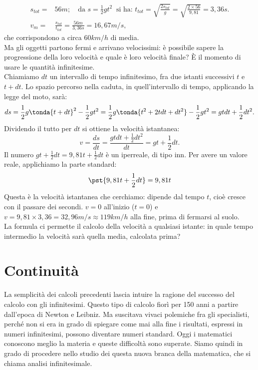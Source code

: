 \begin{align*}
 s_{tot}= & 56m;\quad \text{da }s=\frac{1}{2}gt^2\ \text{ si ha: }
 t_{tot}=\sqrt{\frac{2s_{tot}}{g}}=\sqrt{\frac{2\times 56}{9,81}}=3,36 s.\\
 v_m= & \frac{s_{tot}}{t_{tot}}=\frac{56 m}{3,36 s}=16,67 m/s,
\end{align*}
che corrispondono a circa $60 km/h$ di media.\\
Ma gli oggetti partono fermi e arrivano velocissimi: è possibile sapere la
progressione della loro velocità e quale è loro velocità finale? È il momento
di usare le quantità infinitesime.\\
Chiamiamo $dt$ un intervallo di tempo infinitesimo, fra due istanti successivi
$t$ e $t+dt$.
Lo spazio percorso nella caduta, in quell'intervallo di tempo, applicando la legge del 
moto, sarà:
\[
 ds=\frac{1}{2}g\tonda{t+dt}^2-\frac{1}{2}gt^2=
 \frac{1}{2}g\tonda{t^2+2tdt+dt^2}-\frac{1}{2}gt^2=
 gtdt+\frac{1}{2}dt^2. 
\]
Dividendo il tutto per $dt$ si ottiene la velocità istantanea:
\[
 v=\frac{ds}{dt}=\frac{gtdt+\frac{1}{2}dt^2}{dt}=gt+\frac{1}{2}dt.
\]
Il numero $gt+\frac{1}{2}dt=9,81t+\frac{1}{2}dt$ è un iperreale, di tipo
inn. Per avere un valore reale, applichiamo la parte standard:
\[
 \pst{9,81t+\frac{1}{2}dt}=9,81t
\]
Questa è la velocità istantanea che cerchiamo: dipende dal tempo $t$,
cioè cresce con il passare dei secondi. $v=0$ all'inizio ($t=0$) e
$v=9,81\times 3,36=32,96 m/s\approx 119 km/h$ alla fine, prima di fermarsi al suolo.\\
La formula ci permette il calcolo della velocità a qualsiasi istante:
in quale tempo intermedio la velocità sarà quella media, calcolata prima? 


\section{Continuità}
\label{04_diffcomtinuità}
La semplicità dei calcoli precedenti lascia intuire la ragione del successo del
calcolo con gli infinitesimi.  Questo tipo di calcolo fiorì per 150 anni a 
partire dall'epoca di Newton e Leibniz. Ma suscitava vivaci polemiche fra
gli specialisti, perché non si era in grado di spiegare come mai alla fine i 
risultati, espressi in numeri infinitesimi, possono diventare numeri standard. 
Oggi i matematici conoscono meglio la materia e queste difficoltà sono superate.
Siamo quindi in grado di procedere nello studio dei questa nuova branca della 
matematica, che si chiama analisi infinitesimale.

